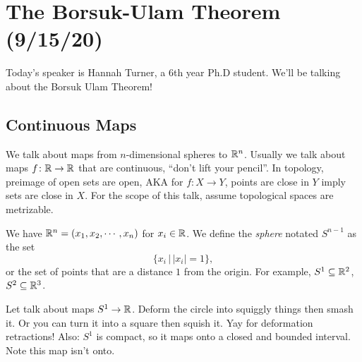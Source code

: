 \section{The Borsuk-Ulam Theorem (9/15/20)}
Today's speaker is Hannah Turner, a 6th year Ph.D student. We'll be talking about the Borsuk Ulam Theorem!
\subsection{Continuous Maps}
We talk about maps from $n$-dimensional spheres to $\mathbb{R}^{n}$. Usually we talk about maps $f \colon  \mathbb{R} \to \mathbb{R}$ that are continuous, ``don't lift your pencil''. In topology, preimage of open sets are open, AKA for $f \colon  X \to Y$, points are close in $Y$ imply sets are close in $X$. For the scope of this talk, assume topological spaces are metrizable.
\begin{definition}[Sphere]
    We have $\mathbb{R}^{n}=(x_1,x_2,\cdots,x_n)$ for $x_i\in \mathbb{R}$. We define the \emph{sphere} notated $S^{n-1}$ as the set \[
    \{x_i \,\big|\,|x_i|=1\},
    \] or the set of points that are a distance $1$ from the origin. For example, $S^{1}  \subseteq \mathbb{R}^2$, $S^{2} \subseteq \mathbb{R}^3$.
\end{definition}
Let talk about maps $S^{1} \to \mathbb{R}$. Deform the circle into squiggly things then smash it. Or you can turn it into a square then squish it. Yay for deformation retractions! Also: $S^{1} $ is compact, so it maps onto a closed and bounded interval. Note this map isn't onto.

